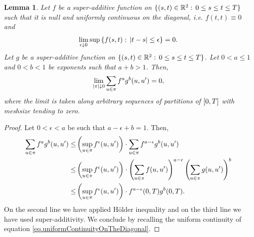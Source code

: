 \documentclass[10pt,a4paper]{article}
\newtheorem{lemma}[thm]{Lemma}
\begin{document}
\begin{appendices}
\begin{lemma}\label{lemma.noCorrectionTermsInIntegrationByParts}
	Let $f$ be a super-additive   function on $\lbrace (s,t) \in \mathbb{R}^{2}:\, 0 \leq s \leq t \leq T \rbrace$ such that it is null and uniformly continuous on the diagonal, i.e. $f(t,t) \equiv 0$ and 
		\begin{equation}\label{eq.uniformContinuityOnTheDiagonal}
		\lim_{\epsilon\downarrow 0} \sup \left\lbrace f(s,t): \, \left\lvert {t-s} \right\rvert \leq \epsilon\right\rbrace
		=0.
		\end{equation}
	Let $g$ be a  super-additive function on $\lbrace (s,t) \in \mathbb{R}^{2}:\, 0 \leq s \leq t \leq T \rbrace$. Let $0< a \leq 1$ and $0<b<1$ be exponents such that $a+b>1$. Then,
	 \begin{equation*}
	 \lim_{\left\lvert {\pi} \right\rvert\downarrow 0 } \sum_{u\in\pi} f^{a} g^{b} (u,u^{\prime}) = 0, 
	 \end{equation*}
	 where the limit is taken along arbitrary sequences of partitions of ${[0,T]}$  with meshsize tending to zero. 
\end{lemma}
\begin{proof}
	Let $0<\epsilon<a$ be such that $a-\epsilon + b =1$. Then,
	\begin{equation*}
	\begin{split}
	\sum_{u\in\pi} f^a g^b (u,u^{\prime}) \leq  & 
	\left(\sup_{u\in\pi} f ^{\epsilon} (u,u^{\prime})\right) 
	\cdot 
	\sum_{u\in\pi} f^{a-\epsilon}g^{b} (u,u^{\prime}) \\
	\leq & 
	\left(\sup_{u\in\pi} f ^{\epsilon} (u,u^{\prime})\right) 
	\cdot 
	\left( 
		\sum_{u\in\pi} f(u,u^{\prime}) 
	\right)^{a-\epsilon}
	\left( 
	\sum_{u\in\pi} g(u,u^{\prime}) 
	\right)^{b} \\
	\leq & 
	\left(\sup_{u\in\pi} f ^{\epsilon} (u,u^{\prime})\right) 
	\cdot f^{a-\epsilon}(0,T) g^{b}(0,T). 
	\end{split}
	\end{equation*}
	On the second line we have applied H\"older inequality and on the third line we have used super-additivity. We conclude by recalling the uniform continuity of equation \eqref{eq.uniformContinuityOnTheDiagonal}. 
\end{proof}


\end{appendices}
\end{document}
